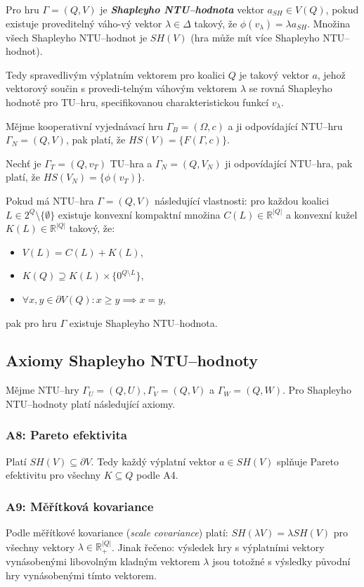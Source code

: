         Pro hru $\Gamma = (Q, V)$ je \textit{\textbf{Shapleyho NTU--hodnota}} vektor $a_{SH} \in V(Q)$, pokud existuje proveditelný váho-vý vektor $\lambda \in \Delta$ takový, že $\phi(v_\lambda) = \lambda a_{SH}$. Množina všech Shapleyho NTU--hodnot je $SH(V)$ (hra může mít více Shapleyho NTU--hodnot).

        Tedy spravedlivým výplatním vektorem pro koalici $Q$ je takový vektor $a$, jehož vektorový součin s provedi-telným váhovým vektorem $\lambda$ se rovná Shapleyho hodnotě pro TU--hru, specifikovanou charakteristickou funkcí $v_\lambda$.

        Mějme kooperativní vyjednávací hru $\Gamma_B = (\Omega, c)$ a ji odpovídající NTU--hru $\Gamma_N = (Q, V)$, pak platí, že $HS(V) = \{F(\Gamma, c)\}$.

        Nechť je $\Gamma_T = (Q, v_T)$ TU--hra a $\Gamma_N = (Q, V_N)$ ji odpovídající NTU--hra, pak platí, že $HS(V_N) = \{\phi(v_T)\}$.

        Pokud má NTU--hra $\Gamma = (Q, V)$ následující vlastnosti: pro každou koalici $L \in 2^Q \setminus \{\emptyset\}$ existuje konvexní kompaktní množina $C(L) \in \mathbb{R}^{|Q|}$ a konvexní kužel $K(L) \in \mathbb{R}^{|Q|}$ takový, že:
        \begin{itemize}
            \item $V(L) = C(L) + K(L)$,
            \item $K(Q) \supseteq K(L) \times \{0^{Q\setminus L}\}$,
            \item $\forall x, y \in \partial V(Q): x \geqslant y \implies x = y$,
        \end{itemize}
        pak pro hru $\Gamma$ existuje Shapleyho NTU--hodnota.

    \subsection{Axiomy Shapleyho NTU--hodnoty}
        Mějme NTU--hry $\Gamma_U = (Q, U), \Gamma_V = (Q, V)$ a $\Gamma_W = (Q, W)$. Pro Shapleyho NTU--hodnoty platí následující axiomy.

        \subsubsection*{A8: Pareto efektivita}
            Platí $SH(V) \subseteq \partial V$. Tedy každý výplatní vektor $a \in SH(V)$ splňuje Pareto efektivitu pro všechny $K \subseteq Q$ podle A4.

        \subsubsection*{A9: Měřítková kovariance}
            Podle měřítkové kovariance (\textit{scale covariance}) platí: $SH(\lambda V) = \lambda SH(V)$ pro všechny vektory $\lambda \in \mathbb{R}^{|Q|}_{+}$. Jinak řečeno: výsledek hry s výplatními vektory vynásobenými libovolným kladným vektorem $\lambda$ jsou totožné s výsledky původní hry vynásobenými tímto vektorem.

